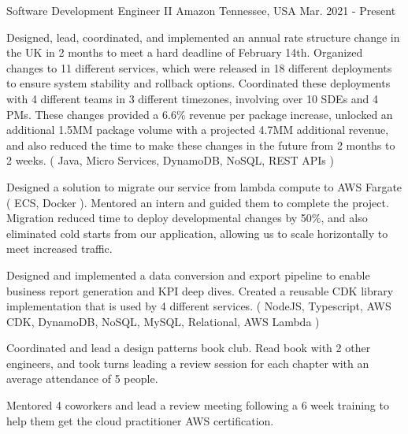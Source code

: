 

\begin{cventries}

  \cventry
    {Software Development Engineer II} %
    {Amazon} %
    {Tennessee, USA} %
    {Mar. 2021 - Present} %
    {
      \begin{cvitems} %
        \item {Designed, lead, coordinated, and implemented an annual rate structure change in the UK in 2 months to meet a hard deadline of February 14th. Organized changes to 11 different services, which were released in 18 different deployments to ensure system stability and rollback options. Coordinated these deployments with 4 different teams in 3 different timezones, involving over 10 SDEs and 4 PMs. These changes provided a 6.6\% revenue per package increase, unlocked an additional 1.5MM package volume with a projected 4.7MM additional revenue, and also reduced the time to make these changes in the future from 2 months to 2 weeks. ( Java, Micro Services, DynamoDB, NoSQL, REST APIs )}
        \item {Designed a solution to migrate our service from lambda compute to AWS Fargate ( ECS, Docker ). Mentored an intern and guided them to complete the project. Migration reduced time to deploy developmental changes by 50\%, and also eliminated cold starts from our application, allowing us to scale horizontally to meet increased traffic.}
        \item {Designed and implemented a data conversion and export pipeline to enable business report generation and KPI deep dives. Created a reusable CDK library implementation that is used by 4 different services. ( NodeJS, Typescript, AWS CDK, DynamoDB, NoSQL, MySQL, Relational, AWS Lambda )}
        \item {Coordinated and lead a design patterns book club. Read book with 2 other engineers, and took turns leading a review session for each chapter with an average attendance of 5 people.}
        \item {Mentored 4 coworkers and lead a review meeting following a 6 week training to help them get the cloud practitioner AWS certification.}
      \end{cvitems}
    }


\end{cventries}
